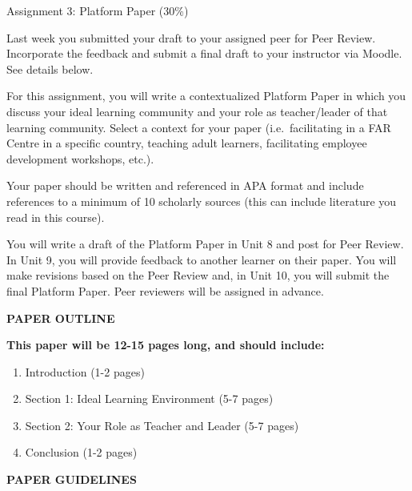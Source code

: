 \documentclass[
]{book}
\providecommand{\tightlist}{%
  \setlength{\itemsep}{0pt}\setlength{\parskip}{0pt}}
\begin{document}
\begin{assessment}
{Assignment 3: Platform Paper (30\%)}

Last week you submitted your draft to your assigned peer for Peer
Review. Incorporate the feedback and submit a final draft to your
instructor via Moodle. See details below.

For this assignment, you will write a contextualized Platform Paper in
which you discuss your ideal learning community and your role as
teacher/leader of that learning community. Select a context for your
paper (i.e.~facilitating in a FAR Centre in a specific country, teaching
adult learners, facilitating employee development workshops, etc.).

Your paper should be written and referenced in APA format and include
references to a minimum of 10 scholarly sources (this can include
literature you read in this course).

You will write a draft of the Platform Paper in Unit 8 and post for Peer
Review. In Unit 9, you will provide feedback to another learner on their
paper. You will make revisions based on the Peer Review and, in Unit 10,
you will submit the final Platform Paper. Peer reviewers will be
assigned in advance.

\textbf{PAPER OUTLINE}

\textbf{This paper will be 12-15 pages long, and should include:}

\begin{enumerate}
\def\labelenumi{\arabic{enumi}.}
\tightlist
\item
  Introduction (1-2 pages)
\item
  Section 1: Ideal Learning Environment (5-7 pages)
\item
  Section 2: Your Role as Teacher and Leader (5-7 pages)
\item
  Conclusion (1-2 pages)
\end{enumerate}

\textbf{PAPER GUIDELINES}


\end{assessment}
\end{document}
